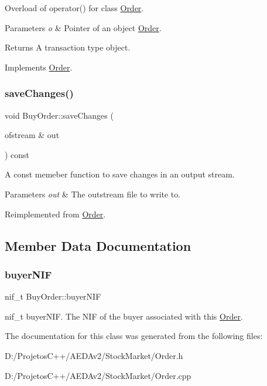 Overload of operator() for class \hyperlink{class_order}{Order}. 
\begin{DoxyParams}{Parameters}
{\em o} & Pointer of an object \hyperlink{class_order}{Order}. \\
\hline
\end{DoxyParams}
\begin{DoxyReturn}{Returns}
A transaction type object. 
\end{DoxyReturn}


Implements \hyperlink{class_order_a85d5de18c8664085619e3a5c74d47a25}{Order}.

\mbox{\label{class_buy_order_aa4f087d0dbc1f6e8937c0b3679fc2f7b}} 
\subsubsection{\texorpdfstring{save\+Changes()}{saveChanges()}}
{\footnotesize\ttfamily void Buy\+Order\+::save\+Changes (\begin{DoxyParamCaption}\item[{ofstream \&}]{out }\end{DoxyParamCaption}) const\hspace{0.3cm}{\ttfamily [virtual]}}

A const memeber function to save changes in an output stream. 
\begin{DoxyParams}{Parameters}
{\em out} & The outstream file to write to. \\
\hline
\end{DoxyParams}


Reimplemented from \hyperlink{class_order_a83989bde0a9b40cbeb0e87c965f6096e}{Order}.



\subsection{Member Data Documentation}
\mbox{\label{class_buy_order_a5914aebb1dd8bb32d1b7481235d833fc}} 
\subsubsection{\texorpdfstring{buyer\+N\+IF}{buyerNIF}}
{\footnotesize\ttfamily nif\+\_\+t Buy\+Order\+::buyer\+N\+IF\hspace{0.3cm}{\ttfamily [private]}}

nif\+\_\+t buyer\+N\+IF. The N\+IF of the buyer associated with this \hyperlink{class_order}{Order}. 

The documentation for this class was generated from the following files\+:\begin{DoxyCompactItemize}
\item 
D\+:/\+Projetos\+C++/\+A\+E\+D\+Av2/\+Stock\+Market/Order.\+h\item 
D\+:/\+Projetos\+C++/\+A\+E\+D\+Av2/\+Stock\+Market/Order.\+cpp\end{DoxyCompactItemize}
